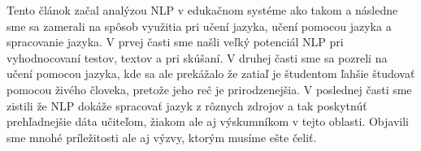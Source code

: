 \documentclass[10pt,slovak,a4paper,twoside]{article}
\begin{document}
	Tento článok začal analýzou NLP v edukačnom systéme ako takom a následne sme sa zamerali na spôsob využitia pri učení jazyka, 
	učení pomocou jazyka a spracovanie jazyka. V prvej časti sme našli veľký potenciál NLP pri vyhodnocovaní testov, textov a pri skúšaní.
	V druhej časti sme sa pozreli na učení pomocou jazyka, kde sa ale prekážalo že zatiaľ je študentom ľahšie študovať pomocou živého človeka, 
	pretože jeho reč je prirodzenejšia. V poslednej časti sme zistili že NLP dokáže spracovať jazyk z rôznych zdrojov a tak poskytnúť prehľadnejšie dáta
	učiteľom, žiakom ale aj výskumníkom v tejto oblasti. Objavili sme mnohé príležitosti ale aj výzvy, ktorým musíme ešte čeliť.


 
\end{document}
